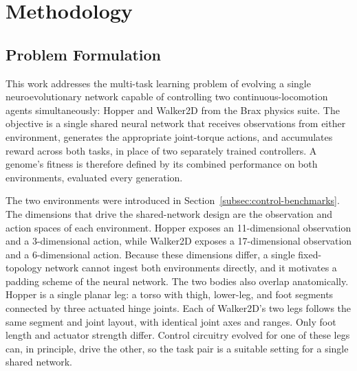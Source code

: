 \documentclass[12pt]{article}
\begin{document}


\section{Methodology}
\label{sec:methodology}

\subsection{Problem Formulation}
\label{subsec:problem-formulation}

This work addresses the multi-task learning problem of evolving a single neuroevolutionary network capable of controlling two continuous-locomotion agents simultaneously: Hopper and Walker2D from the Brax physics suite.
The objective is a single shared neural network that receives observations from either environment, generates the appropriate joint-torque actions, and accumulates reward across both tasks, in place of two separately trained controllers.
A genome's fitness is therefore defined by its combined performance on both environments, evaluated every generation.

The two environments were introduced in Section~\ref{subsec:control-benchmarks}. The dimensions that drive the shared-network design are the observation and action spaces of each environment.
Hopper exposes an 11-dimensional observation and a 3-dimensional action, while Walker2D exposes a 17-dimensional observation and a 6-dimensional action.
Because these dimensions differ, a single fixed-topology network cannot ingest both environments directly, and it motivates a padding scheme of the neural network.
The two bodies also overlap anatomically.
Hopper is a single planar leg: a torso with thigh, lower-leg, and foot segments connected by three actuated hinge joints.
Each of Walker2D's two legs follows the same segment and joint layout, with identical joint axes and ranges. Only foot length and actuator strength differ.
Control circuitry evolved for one of these legs can, in principle, drive the other, so the task pair is a suitable setting for a single shared network.
\end{document}
